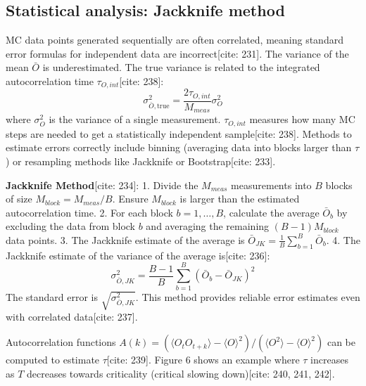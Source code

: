 \documentclass[11pt]{article}
\begin{document}
\subsection{Statistical analysis: Jackknife method}

MC data points generated sequentially are often correlated, meaning standard error formulas for independent data are incorrect[cite: 231]. The variance of the mean $\bar{O}$ is underestimated. The true variance is related to the integrated autocorrelation time $\tau_{O, int}$[cite: 238]:
\begin{equation}
\sigma^2_{\bar{O}, \text{true}} = \frac{2 \tau_{O, int}}{M_{meas}} \sigma^2_O \label{eq:true_variance}
\end{equation}
where $\sigma^2_O$ is the variance of a single measurement. $\tau_{O, int}$ measures how many MC steps are needed to get a statistically independent sample[cite: 238].
Methods to estimate errors correctly include binning (averaging data into blocks larger than $\tau$) or resampling methods like Jackknife or Bootstrap[cite: 233].

\textbf{Jackknife Method}[cite: 234]:
1.  Divide the $M_{meas}$ measurements into $B$ blocks of size $M_{block} = M_{meas}/B$. Ensure $M_{block}$ is larger than the estimated autocorrelation time.
2.  For each block $b = 1, \dots, B$, calculate the average $\bar{O}_b$ by excluding the data from block $b$ and averaging the remaining $(B-1)M_{block}$ data points.
3.  The Jackknife estimate of the average is $\bar{O}_{JK} = \frac{1}{B} \sum_{b=1}^B \bar{O}_b$.
4.  The Jackknife estimate of the variance of the average is[cite: 236]:
    \begin{equation}
    \sigma^2_{\bar{O}, JK} = \frac{B-1}{B} \sum_{b=1}^B (\bar{O}_b - \bar{O}_{JK})^2 \label{eq:jackknife_var}
    \end{equation}
    The standard error is $\sqrt{\sigma^2_{\bar{O}, JK}}$. This method provides reliable error estimates even with correlated data[cite: 237].

Autocorrelation functions $A(k) = (\langle O_t O_{t+k} \rangle - \langle O \rangle^2) / (\langle O^2 \rangle - \langle O \rangle^2)$ can be computed to estimate $\tau$[cite: 239]. Figure 6 shows an example where $\tau$ increases as $T$ decreases towards criticality (critical slowing down)[cite: 240, 241, 242].
\end{document}
